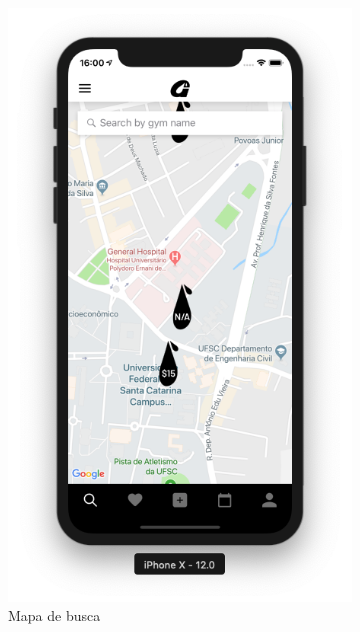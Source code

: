 \begin{figure}[H]
	\centering
    \begin{subfigure}[b]{0.3\textwidth}
        \includegraphics[width=\textwidth]{pfc/figuras/tr-map.png}
        \caption{Mapa de busca}
        \label{fig:tr-home-map}
    \end{subfigure}
    ~
	\begin{subfigure}[b]{0.3\textwidth}

\end{subfigure}
\end{figure}
